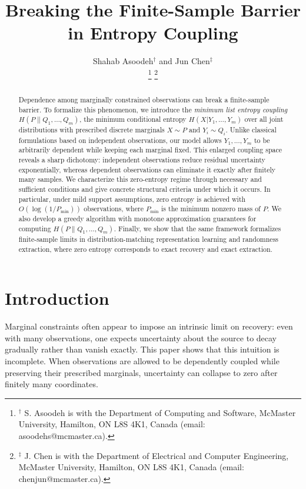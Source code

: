 \documentclass[journal]{IEEEtran}
\title{Breaking the Finite-Sample Barrier in Entropy Coupling}
\author{%
Shahab Asoodeh${}^\dagger$ and
Jun Chen${}^\ddagger$\\

\thanks{${}^\dagger$ S. Asoodeh is with the Department of Computing and Software, McMaster University, Hamilton,
ON L8S 4K1, Canada (email: {asoodehs@mcmaster.ca}).}
\thanks{${}^\ddagger$ J. Chen is with the Department of Electrical and Computer Engineering, McMaster University, Hamilton,
ON L8S 4K1, Canada (email: {chenjun@mcmaster.ca}).}



}
\date{}
\newcommand{\1}{\mathbf{1}}
\begin{document}
\onecolumn

\maketitle

\begin{abstract}
Dependence among marginally constrained observations can break a finite-sample barrier. To formalize this phenomenon, we introduce the \emph{minimum list entropy coupling} \(H(P\|Q_1,\dots,Q_m)\), the minimum conditional entropy \(H(X|Y_1,\dots,Y_m)\) over all joint distributions with prescribed discrete marginals \(X\sim P\) and \(Y_i\sim Q_i\). Unlike classical formulations based on independent observations, our model allows \(Y_1,\dots,Y_m\) to be arbitrarily dependent while keeping each marginal fixed. This enlarged coupling space reveals a sharp dichotomy: independent observations reduce residual uncertainty exponentially, whereas dependent observations can eliminate it exactly after finitely many samples. We characterize this zero-entropy regime through necessary and sufficient conditions and give concrete structural criteria under which it occurs. In particular, under mild support assumptions, zero entropy is achieved with \(O(\log(1/P_{\min}))\) observations, where \(P_{\min}\) is the minimum
nonzero mass of \(P\). We also develop a greedy algorithm with monotone
approximation guarantees for computing \(H(P\|Q_1,\dots,Q_m)\). Finally, we show that the same framework formalizes finite-sample limits in distribution-matching representation learning and randomness extraction, where zero entropy corresponds to exact recovery and exact extraction.
\end{abstract}

\section{Introduction}\label{sec:intro}


Marginal constraints often appear to impose an intrinsic limit on recovery: even with many observations, one expects uncertainty about the source to decay gradually rather than vanish exactly. This paper shows that this intuition is incomplete. When observations are allowed to be dependently coupled while preserving their prescribed marginals, uncertainty can collapse to zero after finitely many coordinates. 
\end{document}

